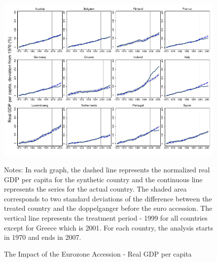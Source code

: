 \documentclass[12pt]{article}
\newcommand{\annote}[1]{\parbox{\textwidth}{\renewcommand{\baselinestretch}{1.0}\vspace{12pt} \small Notes: #1}}
\begin{document}
\begin{appendices}
\begin{figure}[h!]
    \centering
    \caption{The Impact of the Eurozone Accession - Real GDP per capita}
    \label{F_rgdpnapc}
    \includegraphics[width=\textwidth]{Output/Figures/SCM_normgdppc_s_Annual.pdf}
    \annote{In each graph, the dashed line represents the normalized real GDP per capita for the synthetic country and the continuous line represents the series for the actual country. The shaded area corresponds to two standard deviations of the difference between the treated country and the doppelganger before the euro accession. The vertical line represents the treatment period - 1999 for all countries except for Greece which is 2001. For each country, the analysis starts in 1970 and ends in 2007. }
    \label{F_normgdppc}
\end{figure}


\clearpage
\begin{landscape}

\end{landscape}
\end{appendices}
\end{document}
